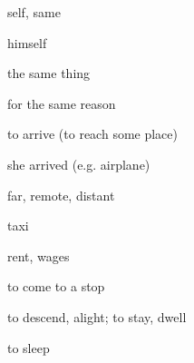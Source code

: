 \documentclass[avery5371,grid,frame]{flashcards}
\begin{document}
\begin{flashcard}{\LARGE self, same}
\LARGE {}
\end{flashcard}
\begin{flashcard}{\LARGE himself}
\LARGE {}
\end{flashcard}
\begin{flashcard}{\LARGE the same thing}
\LARGE {}
\end{flashcard}
\begin{flashcard}{\LARGE for the same reason}
\LARGE {}
\end{flashcard}
\begin{flashcard}{\LARGE to arrive (to reach some place)}
\LARGE {}
\end{flashcard}
\begin{flashcard}{\LARGE she arrived (e.g. airplane)}
\LARGE {}
\end{flashcard}
\begin{flashcard}{\LARGE far, remote, distant}
\LARGE {}
\end{flashcard}
\begin{flashcard}{\LARGE taxi}
\LARGE {}
\end{flashcard}
\begin{flashcard}{\LARGE rent, wages}
\LARGE {}
\end{flashcard}
\begin{flashcard}{\LARGE to come to a stop}
\LARGE {}
\end{flashcard}
\begin{flashcard}{\LARGE to descend, alight; to stay, dwell}
\LARGE {}
\end{flashcard}
\begin{flashcard}{\LARGE to sleep}
\LARGE {}
\end{flashcard}
\end{document}
